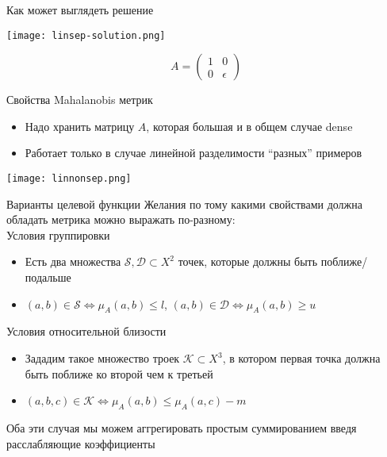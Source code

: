 \documentclass[14pt, fleqn, xcolor={dvipsnames, table}]{beamer}
\begin{document}
\begin{frame}{Как может выглядеть решение}
\begin{center}
\texttt{[image: linsep-solution.png]}
\end{center}
$$
A = \left(\begin{array}{cc}
1 & 0 \\
0 & \epsilon
\end{array}\right)
$$
\end{frame}

\begin{frame}{Свойства Mahalanobis метрик}
\begin{itemize}
  \item Надо хранить матрицу $A$, которая большая и в общем случае dense
  \item Работает только в случае линейной разделимости ``разных'' примеров
\end{itemize}
\begin{center}
\texttt{[image: linnonsep.png]}
\end{center}
\end{frame}

\begin{frame}{Варианты целевой функции}
\small
Желания по тому какими свойствами должна обладать метрика можно выражать по-разному:\\
{\color{blue}Условия группировки}\\
\footnotesize
\begin{itemize}
     \item Есть два множества $\mathcal{S}, \mathcal{D} \subset X^2$ точек, которые должны быть поближе/подальше
     \item $(a,b) \in \mathcal{S} \Leftrightarrow \mu_A(a,b) \le l$,  $(a,b) \in \mathcal{D} \Leftrightarrow \mu_A(a,b) \ge u$
\end{itemize} 
{\small\color{blue}Условия относительной близости}\\
\footnotesize
\begin{itemize}
     \item Зададим такое множество троек $\mathcal{K} \subset X^3$, в котором первая точка должна быть поближе ко второй чем к третьей
     \item $(a,b,c) \in \mathcal{K} \Leftrightarrow \mu_A(a,b) \le \mu_A(a,c) - m$
\end{itemize} 
\small
Оба эти случая мы можем аггрегировать простым суммированием введя расслабляющие коэффициенты
\end{frame}
\end{document}
